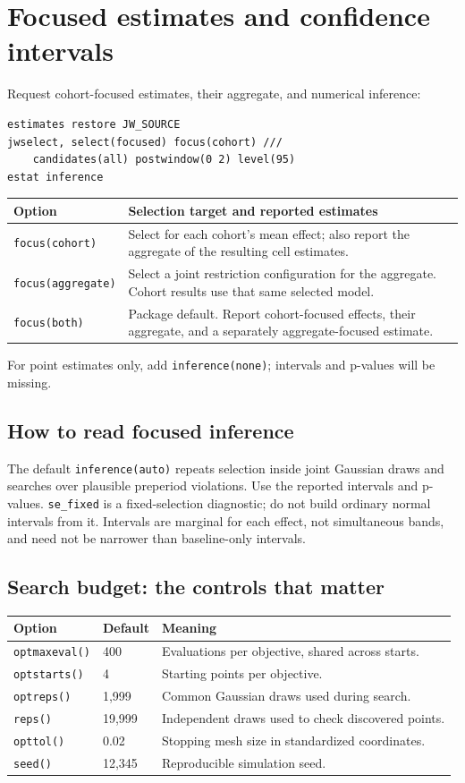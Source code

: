 \documentclass[11pt]{article}
\newcommand{\cmd}[1]{\texttt{#1}}
\begin{document}
\newpage
\section{Focused estimates and confidence intervals}
\label{sec:focused}
Request cohort-focused estimates, their aggregate, and numerical inference:
\begin{lstlisting}
estimates restore JW_SOURCE
jwselect, select(focused) focus(cohort) ///
    candidates(all) postwindow(0 2) level(95)
estat inference
\end{lstlisting}
\begin{tabularx}{\linewidth}{@{}p{.29\linewidth}Y@{}}
\toprule
Option & Selection target and reported estimates \\
\midrule
\cmd{focus(cohort)} & Select for each cohort's mean effect; also report the aggregate of the resulting cell estimates. \\
\cmd{focus(aggregate)} & Select a joint restriction configuration for the aggregate. Cohort results use that same selected model. \\
\cmd{focus(both)} & Package default. Report cohort-focused effects, their aggregate, and a separately aggregate-focused estimate. \\
\bottomrule
\end{tabularx}
For point estimates only, add \cmd{inference(none)}; intervals and p-values
will be missing.

\subsection*{How to read focused inference}
The default \cmd{inference(auto)} repeats selection inside joint Gaussian
draws and searches over plausible preperiod violations. Use the reported
intervals and p-values. \cmd{se\_fixed} is a fixed-selection diagnostic;
do not build ordinary normal intervals from it. Intervals are marginal for
each effect, not simultaneous bands, and need not be narrower than baseline-only intervals.

\subsection*{Search budget: the controls that matter}
\begin{tabularx}{\linewidth}{@{}p{.29\linewidth}p{.12\linewidth}Y@{}}
\toprule
Option & Default & Meaning \\
\midrule
\cmd{optmaxeval()} & 400 & Evaluations per objective, shared across starts. \\
\cmd{optstarts()} & 4 & Starting points per objective. \\
\cmd{optreps()} & 1,999 & Common Gaussian draws used during search. \\
\cmd{reps()} & 19,999 & Independent draws used to check discovered points. \\
\cmd{opttol()} & 0.02 & Stopping mesh size in standardized coordinates. \\
\cmd{seed()} & 12,345 & Reproducible simulation seed. \\
\bottomrule
\end{tabularx}
\end{document}
